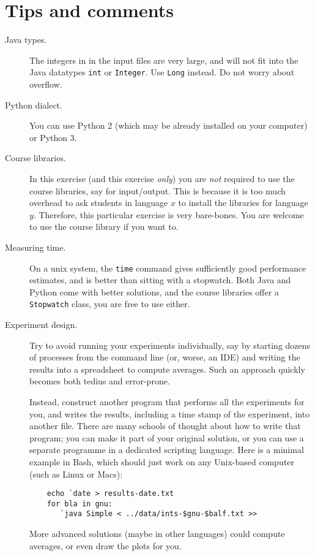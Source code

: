 \documentclass{tufte-handout}
\begin{document}
\section{Tips and comments}

\begin{description}
  \item[Java types.] The integers in in the input files are very large, and will not fit into the Java datatypes \texttt{int} or \texttt{Integer}.
    Use \texttt{Long} instead.
    Do not worry about overflow.
  \item[Python dialect.] You can use Python 2 (which may be already installed on your computer) or Python 3.
  \item[Course libraries.]
    In this exercise (and this exercise \emph{only}) you are \emph{not} required to use the course libraries, say for input/output.
    This is because it is too much overhead to ask students in language $x$ to install the libraries for language $y$.
    Therefore, this particular exercise is very bare-bones.
    You are welcome to use the course library if you want to.
  \item[Measuring time.]
    On a unix system, the \texttt{time} command gives sufficiently good performance estimates, and is better than sitting with a stopwatch.
    Both Java and Python come with better solutions, and the course libraries offer a \texttt{Stopwatch} class, you are free to use either. 
  \item[Experiment design.]
    Try to avoid running your experiments individually, say by starting dozens of processes from the command line (or, worse, an IDE) and writing the results into a spreadsheet to compute averages.
    Such an approach quickly becomes both tedius and error-prone.

    Instead, construct another program that performs all the experiments for you, and writes the results, including a time stamp of the experiment, into another file.
    There are many schools of thought about how to write that program; you can make it part of your original solution, or you can use a separate programme in a dedicated scripting language.
    Here is a minimal example in Bash, which should just work on any Unix-based computer (such as Linux or Macs):
    \lstset{language=sh,basicstyle=\ttfamily}
    \begin{lstlisting}
    echo `date > results-date.txt
    for bla in gnu: 
       `java Simple < ../data/ints-$gnu-$balf.txt >>
    \end{lstlisting}
    More advanced solutions (maybe in other languages) could compute averages, or even draw the plots for you.
\end{description}
\end{document}
